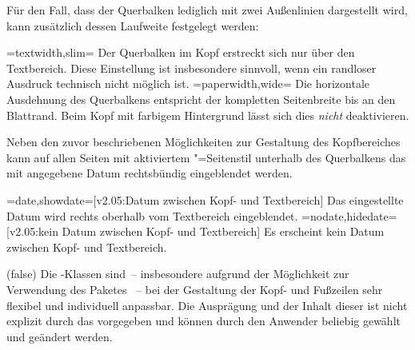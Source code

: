 \begin{DeclareEntity*}{}
\begin{DeclareEntity*}{}
\begin{DeclareEntity*}{}
\begin{Declaration}
%
Für den Fall, dass der Querbalken lediglich mit zwei Außenlinien dargestellt 
wird, kann zusätzlich dessen Laufweite festgelegt werden:
%
\begin{DeclareValues}
\itemval=textwidth,slim=
  Der Querbalken im Kopf erstreckt sich nur über den Textbereich. Diese 
  Einstellung ist insbesondere sinnvoll, wenn ein randloser Ausdruck technisch 
  nicht möglich ist. 
\itemval=paperwidth,wide=
  Die horizontale Ausdehnung des Querbalkens entspricht der kompletten 
  Seitenbreite bis an den Blattrand. Beim Kopf mit farbigem Hintergrund lässt 
  sich dies \emph{nicht} deaktivieren.
\end{DeclareValues}
%
Neben den zuvor beschriebenen Möglichkeiten zur Gestaltung des Kopfbereiches 
kann auf allen Seiten mit aktiviertem "=Seitenstil 
unterhalb des Querbalkens das mit  angegebene Datum rechtsbündig 
eingeblendet werden.
%
\begin{DeclareValues}
\itemval=date,showdate=[v2.05:Datum zwischen Kopf- und Textbereich]
  Das eingestellte Datum wird rechts oberhalb vom Textbereich eingeblendet.
\itemval=nodate,hidedate=[v2.05:kein Datum zwischen Kopf- und Textbereich]
  Es erscheint kein Datum zwischen Kopf- und Textbereich.
\end{DeclareValues}
\end{Declaration}

\begin{Declaration}
  {}
  (false)%
Die \TUDScript-Klassen sind~-- insbesondere aufgrund der Möglichkeit zur 
Verwendung des Paketes ~-- bei der Gestaltung der 
Kopf- und Fußzeilen sehr flexibel und individuell anpassbar. Die Ausprägung und 
der Inhalt dieser ist nicht explizit durch das \CD vorgegeben und können durch 
den Anwender beliebig gewählt und geändert werden. 


\end{Declaration}
\end{DeclareEntity*}
\end{DeclareEntity*}
\end{DeclareEntity*}
